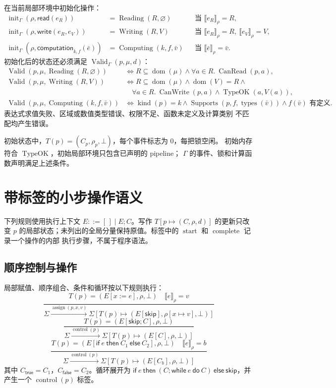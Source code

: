 \documentclass[UTF8,a4paper,11pt,fontset=fandol]{ctexart}
\newcommand{\sem}[1]{\llbracket #1\rrbracket}
\newcommand{\kw}[1]{\mathsf{#1}}
\newcommand{\dom}{\operatorname{dom}}
\newcommand{\kind}{\operatorname{kind}}
\newcommand{\step}[1]{\xrightarrow{#1}}
\newcommand{\Read}{\operatorname{Reading}}
\newcommand{\Write}{\operatorname{Writing}}
\newcommand{\Compute}{\operatorname{Computing}}
\begin{document}
在当前局部环境中初始化操作：
\[
\begin{aligned}
\operatorname{init}_\Gamma(\rho,\kw{read}(e_R))
 &=\Read(R,\varnothing)
 &&\text{当 }\sem{e_R}_{\rho}=R,\\
\operatorname{init}_\Gamma(\rho,\kw{write}(e_R,e_V))
 &=\Write(R,V)
 &&\text{当 }\sem{e_R}_{\rho}=R,\ \sem{e_V}_{\rho}=V,\\
\operatorname{init}_\Gamma(\rho,\kw{computation}_{k,f}(\bar e))
 &=\Compute(k,f,\bar v)
 &&\text{当 }\sem{\bar e}_{\rho}=\bar v.
\end{aligned}
\]
初始化后的状态还必须满足 $\operatorname{Valid}_\Gamma(p,\mu,d)$：
\[
\begin{aligned}
\operatorname{Valid}(p,\mu,\Read(R,\varnothing))
 &\iff R\subseteq\dom(\mu)\land
   \forall a\in R.\ \operatorname{CanRead}(p,a),\\
\operatorname{Valid}(p,\mu,\Write(R,V))
 &\iff R\subseteq\dom(\mu)\land\dom(V)=R\land\\
 &\quad\forall a\in R.\ \operatorname{CanWrite}(p,a)\land
   \operatorname{TypeOK}(a,V(a)),\\
\operatorname{Valid}(p,\mu,\Compute(k,f,\bar v))
 &\iff \kind(p)=k\land
   \operatorname{Supports}(p,f,\operatorname{types}(\bar v))\land
   f(\bar v)\text{ 有定义}.
\end{aligned}
\]
表达式求值失败、区域或数值类型错误、权限不足、函数未定义及计算类别
不匹配均产生错误。

初始状态中，$T(p)=(C_p,\rho_p,\bot)$，每个事件标志为 $0$，每把锁空闲。
初始内存符合 $\operatorname{TypeOK}$，初始局部环境只包含已声明的 pipeline；
$\Gamma$ 的事件、锁和计算函数声明满足上述条件。

\section{带标签的小步操作语义}

下列规则使用执行上下文
$E::=[\,]\mid E;C$。写作 $T[p\mapsto(C,\rho,d)]$ 的更新只改变 $p$
的局部状态；未列出的全局分量保持原值。标签中的
$\operatorname{start}$ 和 $\operatorname{complete}$ 记录一个操作的内部
执行步骤，不属于程序语法。

\subsection{顺序控制与操作}

局部赋值、顺序组合、条件和循环按以下规则执行：
\[
\frac{T(p)=(E[x:=e],\rho,\bot)\quad\sem e_\rho=v}
 {\Sigma\step{\operatorname{assign}(p,x,v)}
  \Sigma[T(p)\mapsto(E[\kw{skip}],\rho[x\mapsto v],\bot)]}
\]
\[
\frac{T(p)=(E[\kw{skip};C],\rho,\bot)}
 {\Sigma\step{\operatorname{control}(p)}
  \Sigma[T(p)\mapsto(E[C],\rho,\bot)]}
\]
\[
\frac{T(p)=(E[\kw{if}\ e\ \kw{then}\ C_1\ \kw{else}\ C_2],\rho,\bot)
 \quad\sem e_\rho=b}
 {\Sigma\step{\operatorname{control}(p)}
  \Sigma[T(p)\mapsto(E[C_b],\rho,\bot)]}
\]
其中 $C_{\kw{true}}=C_1$，$C_{\kw{false}}=C_2$。循环展开为
$\kw{if}\ e\ \kw{then}\ (C;\kw{while}\ e\ \kw{do}\ C)\
\kw{else}\ \kw{skip}$，并产生一个 $\operatorname{control}(p)$ 标签。
\end{document}
